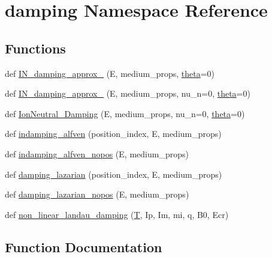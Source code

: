 \hypertarget{namespacedamping}{}\section{damping Namespace Reference}
\label{namespacedamping}
\subsection*{Functions}
\begin{DoxyCompactItemize}
\item 
def \hyperlink{namespacedamping_a63e78eb4bbbff1705852a5380075b2c3}{I\+N\+\_\+damping\+\_\+approx\+\_} (E, medium\+\_\+props, \hyperlink{cr__source_8h_a91a3bf9ce71325c8a7cbd31d8c474bff}{theta}=0)
\item 
def \hyperlink{namespacedamping_abddf89538f1bdc199479122581d6b2b1}{I\+N\+\_\+damping\+\_\+approx\+\_} (E, medium\+\_\+props, nu\+\_\+n=0, \hyperlink{cr__source_8h_a91a3bf9ce71325c8a7cbd31d8c474bff}{theta}=0)
\item 
def \hyperlink{namespacedamping_a0108e11f7862f8d6fa335cbb059d4bc7}{Ion\+Neutral\+\_\+\+Damping} (E, medium\+\_\+props, nu\+\_\+n=0, \hyperlink{cr__source_8h_a91a3bf9ce71325c8a7cbd31d8c474bff}{theta}=0)
\item 
def \hyperlink{namespacedamping_ae5e90342015eca66db1d0a218504b25c}{indamping\+\_\+alfven} (position\+\_\+index, E, medium\+\_\+props)
\item 
def \hyperlink{namespacedamping_ac480c9df6c8b27fbbfc5f098c1578400}{indamping\+\_\+alfven\+\_\+nopos} (E, medium\+\_\+props)
\item 
def \hyperlink{namespacedamping_ac60695747688e6315f490c2d7f7361c8}{damping\+\_\+lazarian} (position\+\_\+index, E, medium\+\_\+props)
\item 
def \hyperlink{namespacedamping_a8c8ec7b9696c1d5bff04d58cda14022d}{damping\+\_\+lazarian\+\_\+nopos} (E, medium\+\_\+props)
\item 
def \hyperlink{namespacedamping_ad3191437d3fdd287ff8a74cd6bed1c78}{non\+\_\+linear\+\_\+landau\+\_\+damping} (\hyperlink{cr__source_8h_ac94a6e5794c2d7b59588b14025cfba20}{T}, Ip, Im, mi, q, B0, Ecr)
\end{DoxyCompactItemize}


\subsection{Function Documentation}
\mbox{\label{namespacedamping_ac60695747688e6315f490c2d7f7361c8}} 
